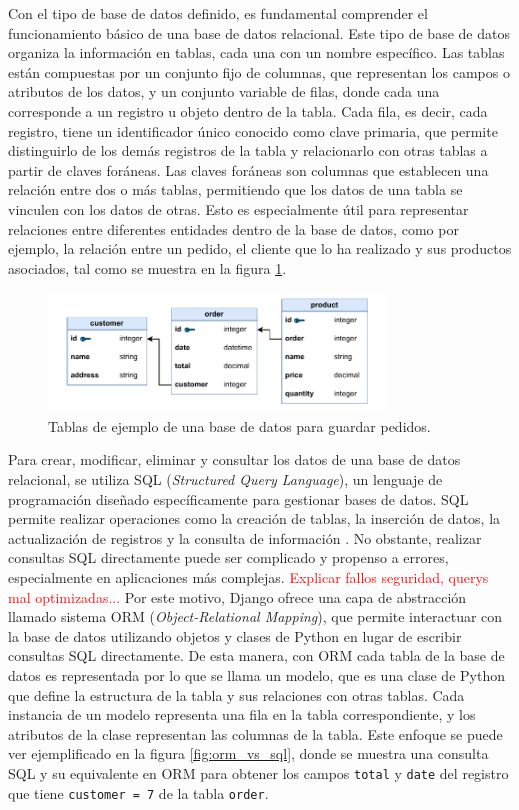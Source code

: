 Con el tipo de base de datos definido, es fundamental comprender el funcionamiento básico de una base de datos relacional. Este tipo de base de datos organiza la información en tablas, cada una con un nombre específico. Las tablas están compuestas por un conjunto fijo de columnas, que representan los campos o atributos de los datos, y un conjunto variable de filas, donde cada una corresponde a un registro u objeto dentro de la tabla. Cada fila, es decir, cada registro, tiene un identificador único conocido como clave primaria, que permite distinguirlo de los demás registros de la tabla y relacionarlo con otras tablas a partir de claves foráneas. Las claves foráneas son columnas que establecen una relación entre dos o más tablas, permitiendo que los datos de una tabla se vinculen con los datos de otras. Esto es especialmente útil para representar relaciones entre diferentes entidades dentro de la base de datos, como por ejemplo, la relación entre un pedido, el cliente que lo ha realizado y sus productos asociados, tal como se muestra en la figura \ref{fig:rel_db}.

\begin{figure}
    \centering
    \includegraphics[width=0.8\textwidth]{figures/theoric_frame/rel_db.pdf}
    \caption{Tablas de ejemplo de una base de datos para guardar pedidos.}
    \label{fig:rel_db}
\end{figure}

Para crear, modificar, eliminar y consultar los datos de una base de datos relacional, se utiliza SQL (\textit{Structured Query Language}), un lenguaje de programación diseñado específicamente para gestionar bases de datos. SQL permite realizar operaciones como la creación de tablas, la inserción de datos, la actualización de registros y la consulta de información \cite{aws_sql}. No obstante, realizar consultas SQL directamente puede ser complicado y propenso a errores, especialmente en aplicaciones más complejas. \textcolor{red}{Explicar fallos seguridad, querys mal optimizadas...} Por este motivo, Django ofrece una capa de abstracción llamado sistema ORM (\textit{Object-Relational Mapping}), que permite interactuar con la base de datos utilizando objetos y clases de Python en lugar de escribir consultas SQL directamente. De esta manera, con ORM cada tabla de la base de datos es representada por lo que se llama un modelo, que es una clase de Python que define la estructura de la tabla y sus relaciones con otras tablas. Cada instancia de un modelo representa una fila en la tabla correspondiente, y los atributos de la clase representan las columnas de la tabla. Este enfoque se puede ver ejemplificado en la figura \ref{fig:orm_vs_sql}, donde se muestra una consulta SQL y su equivalente en ORM para obtener los campos \texttt{total} y \texttt{date} del registro que tiene \texttt{customer = 7} de la tabla \texttt{order}.

